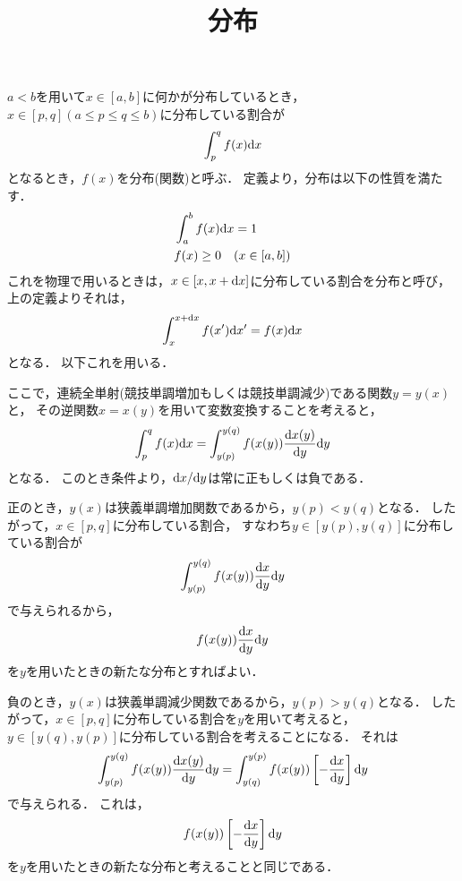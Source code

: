 \documentclass[a4paper,12pt]{jsarticle}
\title{分布}
\newcommand{\dif}[2]{\frac{{\rm d} #1}{{\rm d} #2}}
\begin{document}
\maketitle

$a < b$を用いて$x \in [a, b]$に何かが分布しているとき，
$x \in [p, q](a \le p \le q \le b)$に分布している割合が
\begin{equation}
	\int_p^q f(x) {\rm d}x
\end{equation}
となるとき，$f(x)$を分布(関数)と呼ぶ．
定義より，分布は以下の性質を満たす．
\begin{align}
	&\int_a^b f(x) {\rm d}x = 1 \\
	&f(x) \ge 0 \quad (x \in [a, b])
\end{align}
これを物理で用いるときは，$x \in [x, x + {\rm d}x]$に分布している割合を分布と呼び，
上の定義よりそれは，
\begin{equation}
	\int_x^{x + {\rm d}x} f(x^{\prime}) {\rm d} x^{\prime}
	= f(x) {\rm d}x
\end{equation}
となる．
以下これを用いる．

ここで，連続全単射(競技単調増加もしくは競技単調減少)である関数$y = y(x)$と，
その逆関数$x = x(y)$を用いて変数変換することを考えると，
\begin{equation}
	\int_p^q f(x) {\rm d}x
	= \int_{y(p)}^{y(q)} f(x(y)) \dif{x(y)}{y} {\rm d}y
\end{equation}
となる．
このとき条件より，${\rm d}x/{\rm d}y$は常に正もしくは負である．

正のとき，$y(x)$は狭義単調増加関数であるから，$y(p) < y(q)$となる．
したがって，$x \in [p, q]$に分布している割合，
すなわち$y \in [y(p), y(q)]$に分布している割合が
\begin{equation}
	\int_{y(p)}^{y(q)} f(x(y)) \dif{x}{y} {\rm d}y
\end{equation}
で与えられるから，
\begin{equation}
	f(x(y)) \dif{x}{y} {\rm d}y
\end{equation}
を$y$を用いたときの新たな分布とすればよい．

負のとき，$y(x)$は狭義単調減少関数であるから，$y(p) > y(q)$となる．
したがって，$x \in [p, q]$に分布している割合を$y$を用いて考えると，
$y \in [y(q), y(p)]$に分布している割合を考えることになる．
それは
\begin{equation}
	\int_{y(p)}^{y(q)} f(x(y)) \dif{x(y)}{y} {\rm d}y
	= \int_{y(q)}^{y(p)} f(x(y)) \left[ - \dif{x}{y} \right] {\rm d}y
\end{equation}
で与えられる．
これは，
\begin{equation}
	f(x(y)) \left[ - \dif{x}{y} \right] {\rm d}y
\end{equation}
を$y$を用いたときの新たな分布と考えることと同じである．
\end{document}
